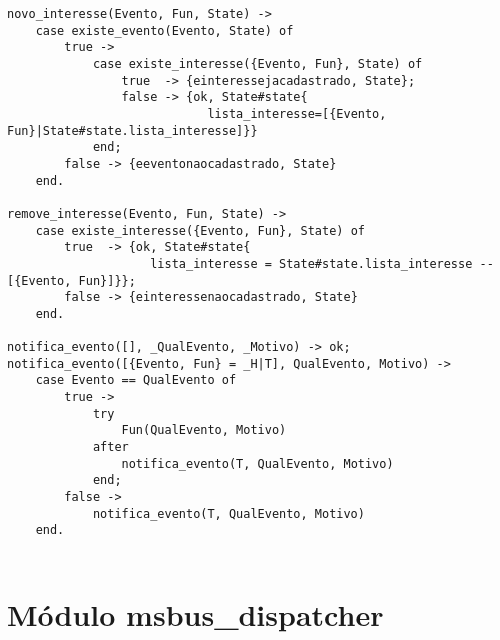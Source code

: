 \begin{lstlisting}
novo_interesse(Evento, Fun, State) ->
	case existe_evento(Evento, State) of
		true -> 
			case existe_interesse({Evento, Fun}, State) of
				true  -> {einteressejacadastrado, State};
				false -> {ok, State#state{
							lista_interesse=[{Evento, Fun}|State#state.lista_interesse]}}
			end;
		false -> {eeventonaocadastrado, State}
	end.

remove_interesse(Evento, Fun, State) ->
	case existe_interesse({Evento, Fun}, State) of
		true  -> {ok, State#state{
					lista_interesse = State#state.lista_interesse -- [{Evento, Fun}]}};
		false -> {einteressenaocadastrado, State}
	end.
		
notifica_evento([], _QualEvento, _Motivo) -> ok;
notifica_evento([{Evento, Fun} = _H|T], QualEvento, Motivo) ->
	case Evento == QualEvento of
		true ->
			try
				Fun(QualEvento, Motivo)
			after
				notifica_evento(T, QualEvento, Motivo)		
			end;
		false ->
			notifica_evento(T, QualEvento, Motivo)
	end.
	

\end{lstlisting}

\section{Módulo msbus\_dispatcher}

